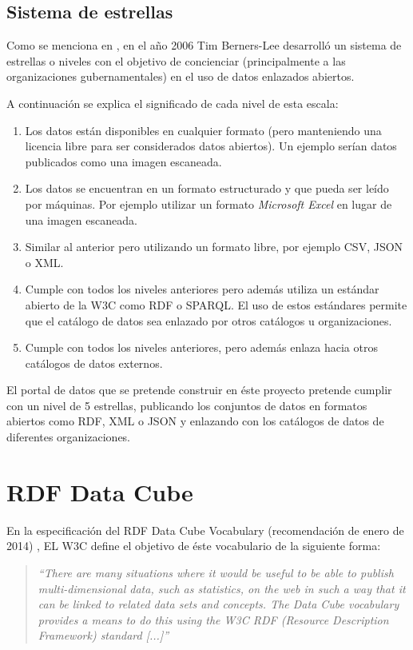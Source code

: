 \subsection{Sistema de estrellas}
Como se menciona en \cite{tbl-linkedopendata}, en el año 2006 Tim Berners-Lee desarrolló un sistema de estrellas o niveles con el objetivo de concienciar (principalmente a las organizaciones gubernamentales) en el uso de datos enlazados abiertos.

A continuación se explica el significado de cada nivel de esta escala:
\begin{enumerate}
    \item Los datos están disponibles en cualquier formato (pero manteniendo una licencia libre para ser considerados datos abiertos).  Un ejemplo serían datos publicados como una imagen escaneada.
    \item Los datos se encuentran en un formato estructurado y que pueda ser leído por máquinas.  Por ejemplo utilizar un formato \textit{Microsoft Excel} en lugar de una imagen escaneada.
    \item Similar al anterior pero utilizando un formato libre, por ejemplo CSV, JSON o XML.
    \item Cumple con todos los niveles anteriores pero además utiliza un estándar abierto de la W3C como RDF o SPARQL.  El uso de estos estándares permite que el catálogo de datos sea enlazado por otros catálogos u organizaciones.
    \item Cumple con todos los niveles anteriores, pero además enlaza hacia otros catálogos de datos externos.
\end{enumerate}

El portal de datos que se pretende construir en éste proyecto pretende cumplir con un nivel de 5 estrellas, publicando los conjuntos de datos en formatos abiertos como RDF, XML o JSON y enlazando con los catálogos de datos de diferentes organizaciones.



\section{RDF Data Cube}
\label{concept:rdf_data_cube}
En la especificación del RDF Data Cube Vocabulary (recomendación de enero de 2014) \cite{w3c:data-cube}, EL W3C define el objetivo de éste vocabulario de la siguiente forma:
\begin{quote}
\textit{``There are many situations where it would be useful to be able to publish multi-dimensional data, such as statistics, on the web in such a way that it can be linked to related data sets and concepts. The Data Cube vocabulary provides a means to do this using the W3C RDF (Resource Description Framework) standard [...]''}
\end{quote}

